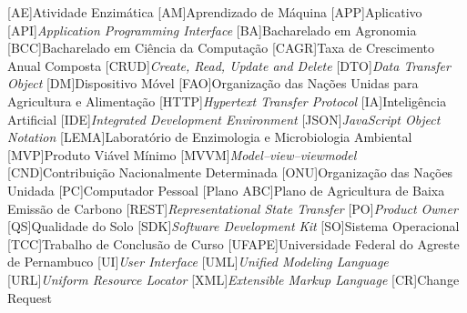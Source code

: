 \begin{acronym}[ACRONYM] 
[AE]{Atividade Enzimática}
[AM]{Aprendizado de Máquina}
[APP]{Aplicativo}
[API]{\textit{Application Programming Interface}}
[BA]{Bacharelado em Agronomia}
[BCC]{Bacharelado em Ciência da Computação}
[CAGR]{Taxa de Crescimento Anual Composta}
[CRUD]{\textit{Create, Read, Update and Delete}}
[DTO]{\textit{Data Transfer Object}}
[DM]{Dispositivo Móvel}
[FAO]{Organização das Nações Unidas para Agricultura e Alimentação}
[HTTP]{\textit{Hypertext Transfer Protocol}}
[IA]{Inteligência Artificial}
[IDE]{\textit{Integrated Development Environment}}
[JSON]{\textit{JavaScript Object Notation}}
[LEMA]{Laboratório de Enzimologia e Microbiologia Ambiental}
[MVP]{Produto Viável Mínimo}
[MVVM]{\textit{Model–view–viewmodel}}
[CND]{Contribuição Nacionalmente Determinada}
[ONU]{Organização das Nações Unidada}
[PC]{Computador Pessoal}
[Plano ABC]{Plano de Agricultura de Baixa Emissão de Carbono}
[REST]{\textit{Representational State Transfer}}
[PO]{\textit{Product Owner}}
[QS]{Qualidade do Solo}
[SDK]{\textit{Software Development Kit}}
[SO]{Sistema Operacional}
[TCC]{Trabalho de Conclusão de Curso}
[UFAPE]{Universidade Federal do Agreste de Pernambuco}
[UI]{\textit{User Interface}}
[UML]{\textit{Unified Modeling Language}}
[URL]{\textit{Uniform Resource Locator}}
[XML]{\textit{Extensible Markup Language}}
[CR]{Change Request}

\end{acronym}
